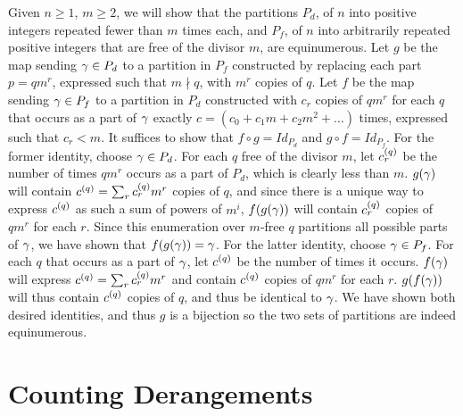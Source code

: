 \documentclass{article}
\begin{document}
Given $n \ge 1$, $m \ge 2$, we will show that the partitions $P_d$, of $n$ into positive integers repeated fewer than $m$ times each, and $P_f$, of $n$ into arbitrarily repeated positive integers that are free of the divisor $m$, are equinumerous. Let $g$ be the map sending $\gamma \in P_d$ to a partition in $P_f$ constructed by replacing each part $p = qm^r$, expressed such that $m \nmid q$, with $m^r$ copies of $q$. Let $f$ be the map sending $\gamma \in P_f$ to a partition in $P_d$ constructed with $c_r$ copies of $qm^r$ for each $q$ that occurs as a part of $\gamma$ exactly $c = (c_0 + c_1m + c_2m^2 + \ldots)$ times, expressed such that $c_r < m$. It suffices to show that $f \circ g = Id_{P_d}$ and $g \circ f = Id_{P_f}$. For the former identity, choose $\gamma \in P_d$. For each $q$ free of the divisor $m$, let $c^{(q)}_r$ be the number of times $qm^r$ occurs as a part of $P_d$, which is clearly less than $m$. $g(\gamma)$ will contain $c^{(q)} = \sum_r c^{(q)}_rm^r$ copies of $q$, and since there is a unique way to express $c^{(q)}$ as such a sum of powers of $m^i$, $f(g(\gamma))$ will contain $c^{(q)}_r$ copies of $qm^r$ for each $r$. Since this enumeration over $m$-free $q$ partitions all possible parts of $\gamma$, we have shown that $f(g(\gamma)) = \gamma$. For the latter identity, choose $\gamma \in P_f$. For each $q$ that occurs as a part of $\gamma$, let $c^{(q)}$ be the number of times it occurs. $f(\gamma)$ will express $c^{(q)} = \sum_r c^{(q)}_rm^r$ and contain $c^{(q)}$ copies of $qm^r$ for each $r$. $g(f(\gamma))$ will thus contain $c^{(q)}$ copies of $q$, and thus be identical to $\gamma$. We have shown both desired identities, and thus $g$ is a bijection so the two sets of partitions are indeed equinumerous.

\section{Counting Derangements}
\end{document}
